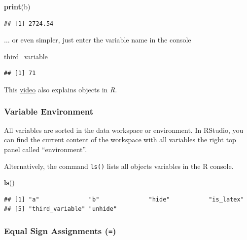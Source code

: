 \documentclass[
]{scrartcl}
\newenvironment{Shaded}{\begin{snugshade}}{\end{snugshade}}
\newcommand{\FunctionTok}[1]{\textcolor[rgb]{0.13,0.29,0.53}{\textbf{#1}}}
\newcommand{\NormalTok}[1]{#1}
\newenvironment{simple}
        {}
        {}
\begin{document}
\begin{Shaded}
\begin{Highlighting}[]
\FunctionTok{print}\NormalTok{(b)}
\end{Highlighting}
\end{Shaded}

\begin{verbatim}
## [1] 2724.54
\end{verbatim}

\(\ldots\) or even simpler, just enter the variable name in the console

\begin{Shaded}
\begin{Highlighting}[]
\NormalTok{third\_variable}
\end{Highlighting}
\end{Shaded}

\begin{verbatim}
## [1] 71
\end{verbatim}

\begin{simple}
This \href{https://vimeo.com/220493412}{video} also explains objects in
\emph{R}.
\end{simple}

\subsubsection{Variable Environment}\label{variable-environment}

All variables are sorted in the data workspace or environment. In RStudio, you can find the current content of the workspace with all variables the right top panel called ``environment''.

Alternatively, the command \texttt{ls()} lists all objects variables in the R console.

\begin{Shaded}
\begin{Highlighting}[]
\FunctionTok{ls}\NormalTok{()}
\end{Highlighting}
\end{Shaded}

\begin{verbatim}
## [1] "a"              "b"              "hide"           "is_latex"      
## [5] "third_variable" "unhide"
\end{verbatim}

\subsubsection{\texorpdfstring{Equal Sign Assignments (\texttt{=})}{Equal Sign Assignments (=)}}\label{assign}
\end{document}

